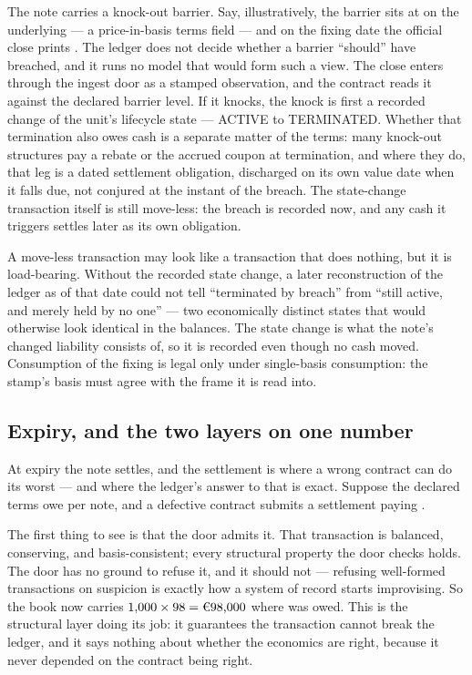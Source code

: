 The note carries a knock-out barrier. Say, illustratively, the barrier sits at
 on the underlying --- a price-in-basis terms field --- and on the fixing date
the official close prints . The ledger does not decide whether a barrier
``should'' have breached, and it runs no model that would form such a view. The close
enters through the ingest door as a stamped observation, and the contract reads it
against the declared barrier level. If it knocks, the knock is first a recorded change
of the unit's lifecycle state --- ACTIVE to TERMINATED. Whether that termination also
owes cash is a separate matter of the terms: many knock-out structures pay a rebate or
the accrued coupon at termination, and where they do, that leg is a dated settlement
obligation, discharged on its own value date when it falls due, not conjured at the
instant of the breach. The state-change transaction itself is still move-less: the
breach is recorded now, and any cash it triggers settles later as its own obligation.

A move-less transaction may look like a transaction that does nothing, but it is
load-bearing. Without the recorded state change, a later reconstruction of the ledger
as of that date could not tell ``terminated by breach'' from ``still active, and
merely held by no one'' --- two economically distinct states that would otherwise look
identical in the balances. The state change is what the note's changed liability
consists of, so it is recorded even though no cash moved. Consumption of the fixing is
legal only under single-basis consumption: the stamp's basis must agree with the frame
it is read into.

\subsection{Expiry, and the two layers on one number}

At expiry the note settles, and the settlement is where a wrong contract can do its
worst --- and where the ledger's answer to that is exact. Suppose the declared terms
owe  per note, and a defective contract submits a settlement paying .

The first thing to see is that the door admits it. That  transaction is
balanced, conserving, and basis-consistent; every structural property the door checks
holds. The door has no ground to refuse it, and it should not --- refusing well-formed
transactions on suspicion is exactly how a system of record starts improvising. So the
book now carries $1{,}000 \times 98 = \EUR{98{,}000}$ where  was owed.
This is the structural layer doing its job: it guarantees the transaction cannot break
the ledger, and it says nothing about whether the economics are right, because it
never depended on the contract being right.

